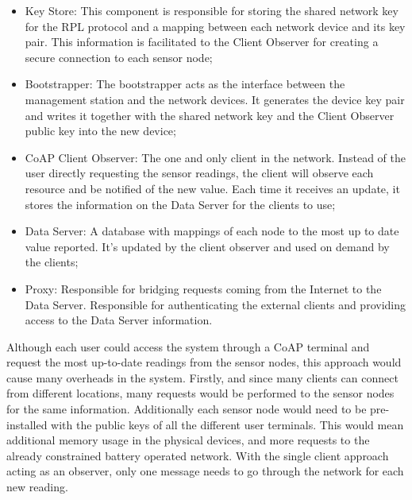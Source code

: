 \begin{itemize}
	\item Key Store: This component is responsible for storing the shared network key for the RPL protocol and a mapping between each network device and its key pair. This information is facilitated to the Client Observer for creating a secure connection to each sensor node;\\
	\item Bootstrapper: The bootstrapper acts as the interface between the management station and the network devices. It generates the device key pair and writes it together with the shared network key and the Client Observer public key into the new device;\\
	\item CoAP Client Observer:  The one and only client in the network. Instead of the user directly requesting the sensor readings, the client will observe each resource and be notified of the new value. Each time it receives an update, it stores the information on the Data Server for the clients to use;\\
	\item Data Server: A database with mappings of each node to the most up to date value reported. It's updated by the client observer and used on demand by the clients;\\
	\item Proxy: Responsible for bridging requests coming from the Internet to the Data Server. Responsible for authenticating the external clients and providing access to the Data Server information.\\
\end{itemize}

Although each user could access the system through a \gls{CoAP} terminal and request the most up-to-date readings from the sensor nodes, this approach would cause many overheads in the system. Firstly, and since many clients can connect from different locations, many requests would be performed to the sensor nodes for the same information. Additionally each sensor node would need to be pre-installed with the public keys of all the different user terminals. This would mean additional memory usage in the physical devices, and more requests to the already constrained battery operated network. With the single client approach acting as an observer, only one message needs to go through the network for each new reading.

